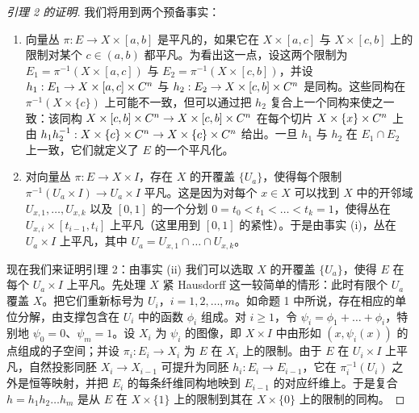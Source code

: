\begin{proof}[引理 2 的证明]
我们将用到两个预备事实：

\begin{enumerate}[label=\roman*.]
\item 向量丛 $\pi: E\to X\times[a,b]$ 是平凡的，如果它在 $X\times[a,c]$ 与 $X\times[c,b]$ 上的限制对某个 $c\in(a,b)$ 都平凡。为看出这一点，设这两个限制为 $E_1=\pi^{-1}(X\times[a,c])$ 与 $E_2=\pi^{-1}(X\times[c,b])$，并设 $h_1: E_1\to X\times[a,c]\times C^n$ 与 $h_2: E_2\to X\times[c,b]\times C^n$ 是同构。这些同构在 $\pi^{-1}(X\times\{c\})$ 上可能不一致，但可以通过把 $h_2$ 复合上一个同构来使之一致：该同构 $X\times[c,b]\times C^n\to X\times[c,b]\times C^n$ 在每个切片 $X\times\{x\}\times C^n$ 上由 $h_1h_2^{-1}: X\times\{c\}\times C^n\to X\times\{c\}\times C^n$ 给出。一旦 $h_1$ 与 $h_2$ 在 $E_1\cap E_2$ 上一致，它们就定义了 $E$ 的一个平凡化。


\item 对向量丛 $\pi: E\to X\times I$，存在 $X$ 的开覆盖 $\{U_a\}$，使得每个限制 $\pi^{-1}(U_a\times I)\to U_a\times I$ 平凡。这是因为对每个 $x\in X$ 可以找到 $X$ 中的开邻域 $U_{x,1},\dots,U_{x,k}$ 以及 $[0,1]$ 的一个分划 $0=t_0<t_1<\dots<t_k=1$，使得丛在 $U_{x,i}\times[t_{i-1},t_i]$ 上平凡（这里用到 $[0,1]$ 的紧性）。于是由事实 (i)，丛在 $U_a\times I$ 上平凡，其中 $U_a=U_{x,1}\cap\dots\cap U_{x,k}$。
\end{enumerate}

现在我们来证明引理 2：由事实 (ii) 我们可以选取
$X$ 的开覆盖 $\{U_a\}$，使得 $E$ 在每个 $U_a\times I$ 上平凡。先处理 $X$ 紧 Hausdorff 这一较简单的情形：此时有限个 $U_a$ 覆盖 $X$。把它们重新标号为 $U_i$，$i=1,2,\dots,m$。如命题 1 中所说，存在相应的单位分解，由支撑包含在 $U_i$ 中的函数 $\phi_i$ 组成。对 $i\ge1$，令 $\psi_i=\phi_1+\dots+\phi_i$，特别地 $\psi_0=0$、$\psi_m=1$。设 $X_i$ 为 $\psi_i$ 的图像，即 $X\times I$ 中由形如 $(x,\psi_i(x))$ 的点组成的子空间；并设 $\pi_i: E_i\to X_i$ 为 $E$ 在 $X_i$ 上的限制。由于 $E$ 在 $U_i\times I$ 上平凡，自然投影同胚 $X_i\to X_{i-1}$ 可提升为同胚 $h_i: E_i\to E_{i-1}$，它在 $\pi_i^{-1}(U_i)$ 之外是恒等映射，并把 $E_i$ 的每条纤维同构地映到 $E_{i-1}$ 的对应纤维上。于是复合 $h=h_1h_2\dots h_m$ 是从 $E$ 在 $X\times\{1\}$ 上的限制到其在 $X\times\{0\}$ 上的限制的同构。


\end{proof}
